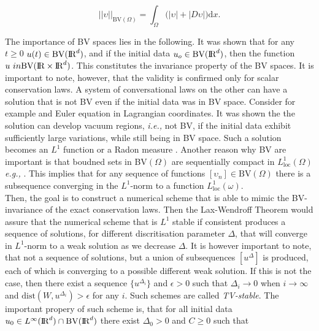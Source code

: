 \documentclass[11pt,a4paper,headinclude=true,DIV=14,BCOR=8mm,chapterprefix,listof=totoc,twoside,openright,abstracton]{scrbook}
\begin{document}
\begin{equation}
    || \upsilon ||_{\text{BV}(\Omega)} = \int_{\Omega}\big(|\upsilon| + |D\upsilon|\big)\text{d}x.
\end{equation}

The importance of BV spaces lies in the following. It was shown \cite{Conway:1966} that for any $t\geq 0$ $u(t)\in \text{BV}(\text{I\!R}^d)$, and if the initial data $u_o\in \text{BV}(\text{I\!R}^d)$, then the function $u \ in \text{BV}(\text{I\!R}\times\text{I\!R}^d)$. This constitutes the invariance property of the BV spaces. It is important to note, however, that the validity is confirmed only for scalar conservation laws. A system of conversational laws on the other can have a solution that is not BV even if the initial data was in BV space. Consider for example and Euler equation in Lagrangian coordinates. It was shown the the solution can develop vacuum regions, \textit{i.e.,} not BV, if the initial data exhibit sufficiently large variations, while still being in BV space.  Such a solution becomes an $L^1$ function or a Radon measure \cite{Chen:2006}. Another reason why BV are important is that boudned sets in BV$(\Omega)$ are sequentially compact in $L^1 _{\text{loc}}(\Omega)$ \textit{e.g.,} \cite{Luigi:2002}. This implies that for any sequence of functions $[\upsilon_n]\in\text{BV}(\Omega)$ there is a subsequence converging in the $L^1$-norm to a function $L^1 _{\text{loc}}(\omega)$. \\

Then, the goal is to construct a numerical scheme that is able to mimic the BV-invariance of the exact conservation laws. Then the Lax-Wendroff Theorem would assure that the numerical scheme that is $L^1$ stable if consistent produces a sequence of solutions, for different discritisation parameter $\Delta$, that will converge in $L^1$-norm to a weak solution as we decrease $\Delta$. It is however important to note, that not a sequence of solutions, but a union of subsequences $[u^{\Delta}]$ is produced, each of which is converging to a possible different weak solution. If this is not the case, then there exist a sequence $\{u^{\Delta_i}\}$ and $\epsilon > 0$ such that $\Delta_i\rightarrow 0 $ when $i\rightarrow \infty$ and $\text{dist}(W,u^{\Delta_i})>\epsilon$ for any $i$. Such schemes are called \textit{TV-stable}. The important propery of such scheme is, that for all initial data $u_0\in L^{\infty}(\text{I\!R}^d)\cap \text{BV}(\text{I\!R}^d)$ there exist $\Delta_0 > 0$ and $C\geq 0$ such that 
\end{document}
